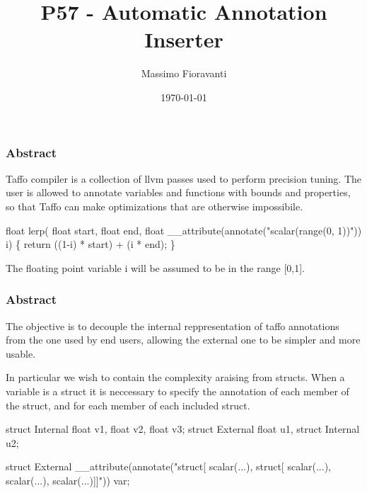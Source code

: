 \documentclass{beamer}
\title{P57 - Automatic Annotation Inserter}
\author{Massimo Fioravanti}
\institute{Polimi}
\date{\today}
\begin{document}
\begin{frame}
	\titlepage
\end{frame}

\begin{frame}[fragile]
	\frametitle{Abstract}
	\begin{block}{}
		Taffo compiler is a collection of llvm passes used to perform precision tuning.
		The user is allowed to annotate variables and functions with bounds and properties, so that Taffo can make optimizations that are otherwise impossibile.
	\end{block}

	\begin{alertblock}{}
	\begin{semiverbatim}
		float lerp(
		\quad float start, 
		\quad float end, 
		\quad float __attribute(annotate("scalar(range(0, 1))")) i)
		\{
		\quad return ((1-i) * start) + (i * end);
		\}
	\end{semiverbatim}
	\end{alertblock}

	\begin{block}{}
		The floating point variable i will be assumed to be in the range [0,1].
	\end{block}
\end{frame}

\begin{frame}[fragile]
	\frametitle{Abstract}
	\begin{block}{}
		The objective is to decouple the internal reppresentation of taffo annotations from the one used by end users, allowing the external one to be simpler and more usable.
	\end{block}

	\begin{block}{}
		In particular we wish to contain the complexity araising from structs.
		When a variable is a struct it is neccessary to specify the annotation of each member of the struct, and for each member of each included struct.
	\end{block}
	
	\begin{alertblock}{}
	\begin{semiverbatim}	
		struct Internal {float v1, float v2, float v3};
		struct External {float u1, struct Internal u2};
		
		struct External __attribute(annotate("struct[
		\quad scalar(...), struct[
		\quad \quad scalar(...), 
		\quad \quad scalar(...), 
		\quad \quad scalar(...)]]")) var;
	\end{semiverbatim}
	\end{alertblock}
\end{frame}
\end{document}
